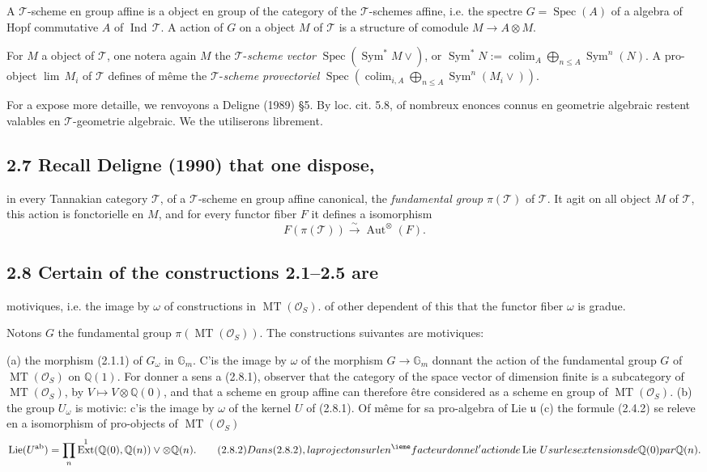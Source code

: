 \documentclass[11pt,a4paper]{article}
\theoremstyle{plain}
\theoremstyle{definition}
\theoremstyle{remark}
\DeclareMathOperator{\Ext}{Ext}
\DeclareMathOperator{\Spec}{Spec}
\DeclareMathOperator{\Aut}{Aut}
\DeclareMathOperator{\Lie}{Lie}
\DeclareMathOperator{\Sym}{Sym}
\DeclareMathOperator{\Ind}{Ind}
\DeclareMathOperator{\MT}{MT}
\DeclareMathOperator{\ab}{ab}
\DeclareMathOperator{\colim}{colim}
\newcommand{\dbG}{\mathbb{G}}
\newcommand{\dbQ}{\mathbb{Q}}
\newcommand{\scrO}{\mathscr{O}}
\newcommand{\scrT}{\mathscr{T}}
\newcommand{\gru}{\mathfrak{u}}
\newcommand{\upvee}{\vee}
\newcommand{\Le}{\leqslant}
\newcommand{\sans}{\textsf}
\newcommand{\simover}{\xrightarrow{\sim}}
\newcommand{\oplusop}{\bigoplus}
\providecommand{\Ext}{\operatorname{Ext}}
\providecommand{\Aut}{\operatorname{Aut}}
\providecommand{\Spec}{\operatorname{Spec}}
\providecommand{\Le}{\leqslant}
\providecommand{\Lie}{\operatorname{Lie}}
\providecommand{\ab}{\mathrm{ab}}
\begin{document}
A $\scrT$-scheme en group affine is a
object en group of the category of the
$\scrT$-schemes affine, i.e. the spectre
$G=\Spec(A)$ of a algebra of Hopf
commutative $A$ of $\Ind\,\scrT$.
A action of $G$ on a object $M$ of $\scrT$
is a structure of comodule $M\to A\otimes M$.

For $M$ a object of $\scrT$, one notera again
$M$ the $\scrT$-{\it scheme vector}
$\Spec(\Sym^*M\upvee)$, or
$\Sym^*N:=\colim_A\oplusop\limits_{n\Le A}\Sym^n(N)$. 
A pro-object $\lim\,M_i$ of $\scrT$ defines
of m\^{e}me the $\scrT$-{\it scheme provectoriel}
$\Spec(\colim_{i,A}\oplusop_{n\Le A}
\Sym^n(M_i\upvee))$.

For a expose more detaille, we
renvoyons a Deligne (1989) \S5.
By loc. cit. 5.8, of nombreux enonces
connus en geometrie algebraic restent
valables en $\scrT$-geometrie algebraic.
We the utiliserons librement.

\subsection*{2.7 Recall Deligne (1990) that one dispose,}
in every Tannakian category $\scrT$,
of a $\scrT$-scheme en group affine
canonical, the {\it fundamental group}
$\pi(\scrT)$ of $\scrT$.
It agit on all object $M$ of $\scrT$, this
action is fonctorielle en $M$, and for every
functor fiber $F$ it defines a
isomorphism 
\begin{equation}
F(\pi(\scrT))\simover \Aut^\otimes(F).\tag{2.7.1}
\end{equation}


\subsection*{2.8 Certain of the constructions 2.1--2.5 are}
motiviques, i.e. the image by $\omega$ of
constructions in $\MT(\scrO_S)$.
of other dependent of this that the functor
fiber $\omega$ is gradue.

Notons $G$ the fundamental group $\pi(\MT(\scrO_S))$.
The constructions suivantes are motiviques:

\medskip\noindent
{\sans (a)}\enspace
the morphism (2.1.1) of $G_\omega$ in
$\dbG_m$.
C'is the image by $\omega$ of the morphism
$G\to\dbG_m$
donnant the action of the fundamental group $G$ of
$\MT(\scrO_S)$ on $\dbQ(1)$.
For donner a sens a (2.8.1), observer that
the category of the space vector of dimension finite is a subcategory of
$\MT(\scrO_S)$, by $V\mapsto V\otimes\dbQ(0)$,
and that a scheme en group affine can therefore
\^{e}tre considered as a scheme en
group of $\MT(\scrO_S)$.
\medskip\noindent
{\sans (b)}\enspace
the group $U_\omega$ is motivic: c'is
the image by $\omega$ of the kernel $U$ of (2.8.1).
Of m\^{e}me for sa pro-algebra of Lie
$\gru$
\medskip\noindent
{\sans (c)}\enspace
the formule (2.4.2) se releve en
a isomorphism of pro-objects of
$\MT(\scrO_S)$
\begin{equation}
\Lie(U^{\ab})=\prod\limits_{n}
\Ext^1(\dbQ(0),\dbQ(n))\upvee\otimes\dbQ(n).
\tag{2.8.2}
Dans (2.8.2), la projecton sur le n^{\ieme}
facteur donne l'action de \Lie\,U sur les
extensions de \dbQ(0) par \dbQ(n).
\end{equation}
\end{document}
